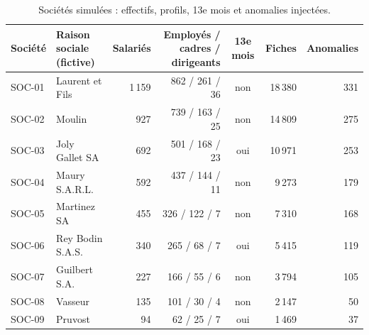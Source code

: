 \begin{table}[htbp]
\centering
\caption{Sociétés simulées : effectifs, profils, 13e mois et anomalies injectées.}
\label{tab:societes}
\small
\begin{tabular}{llrrcrr}
\toprule
\textbf{Société} & \textbf{Raison sociale (fictive)} & \textbf{Salariés} & \textbf{Employés / cadres / dirigeants} & \textbf{13e mois} & \textbf{Fiches} & \textbf{Anomalies} \\
\midrule
SOC-01 & Laurent et Fils & 1\,159 & 862 / 261 / 36 & non & 18\,380 & 331 \\
SOC-02 & Moulin & 927 & 739 / 163 / 25 & non & 14\,809 & 275 \\
SOC-03 & Joly Gallet SA & 692 & 501 / 168 / 23 & oui & 10\,971 & 253 \\
SOC-04 & Maury S.A.R.L. & 592 & 437 / 144 / 11 & non & 9\,273 & 179 \\
SOC-05 & Martinez SA & 455 & 326 / 122 / 7 & non & 7\,310 & 168 \\
SOC-06 & Rey Bodin S.A.S. & 340 & 265 / 68 / 7 & oui & 5\,415 & 119 \\
SOC-07 & Guilbert S.A. & 227 & 166 / 55 / 6 & non & 3\,794 & 105 \\
SOC-08 & Vasseur & 135 & 101 / 30 / 4 & non & 2\,147 & 50 \\
SOC-09 & Pruvost & 94 & 62 / 25 / 7 & oui & 1\,469 & 37 \\
\bottomrule
\end{tabular}
\end{table}
